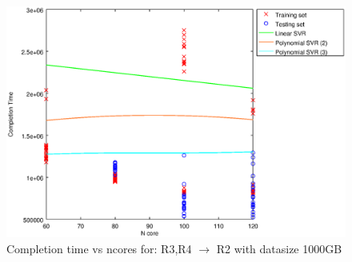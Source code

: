 
\begin {figure}[hbtp]
\centering
\includegraphics[width=\textwidth]{output/R3_R4_VS_R2_1000_ALL_FEATURES/plot_R3_R4_VS_R2_1000_bestmodels.eps}
\caption{Completion time vs ncores for: R3,R4 $\rightarrow$ R2 with datasize 1000GB}
\label{fig:coreonly_linear_R3,R4_R2_1000}
\end {figure}
